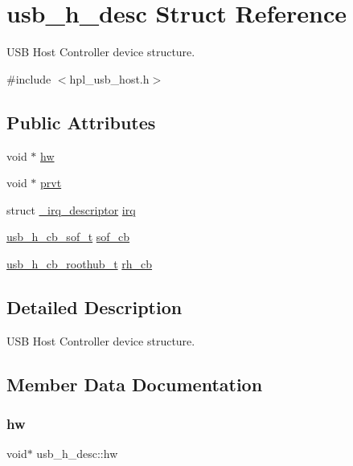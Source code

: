 \hypertarget{structusb__h__desc}{}\section{usb\+\_\+h\+\_\+desc Struct Reference}
\label{structusb__h__desc}


U\+SB Host Controller device structure.  




{\ttfamily \#include $<$hpl\+\_\+usb\+\_\+host.\+h$>$}

\subsection*{Public Attributes}
\begin{DoxyCompactItemize}
\item 
void $\ast$ \hyperlink{structusb__h__desc_a6058c618d39f7836b7025d2352ef08f8}{hw}
\item 
void $\ast$ \hyperlink{structusb__h__desc_a49877672c7dfa8cc9cede4e9b7a0e362}{prvt}
\item 
struct \hyperlink{struct__irq__descriptor}{\+\_\+irq\+\_\+descriptor} \hyperlink{structusb__h__desc_af51d57cf25ab32e379c108388d0e5c70}{irq}
\item 
\hyperlink{hpl__usb__host_8h_aa4342c321cc874eedaefdde86e06e6c3}{usb\+\_\+h\+\_\+cb\+\_\+sof\+\_\+t} \hyperlink{structusb__h__desc_af861986e911d7479de24d5ff65cbc752}{sof\+\_\+cb}
\item 
\hyperlink{hpl__usb__host_8h_aee4ec1554da1298d8875cd8e789c058a}{usb\+\_\+h\+\_\+cb\+\_\+roothub\+\_\+t} \hyperlink{structusb__h__desc_adeab338fa2a4dac953b4305b0b2defad}{rh\+\_\+cb}
\end{DoxyCompactItemize}


\subsection{Detailed Description}
U\+SB Host Controller device structure. 

\subsection{Member Data Documentation}
\mbox{\label{structusb__h__desc_a6058c618d39f7836b7025d2352ef08f8}} 
\subsubsection{\texorpdfstring{hw}{hw}}
{\footnotesize\ttfamily void$\ast$ usb\+\_\+h\+\_\+desc\+::hw}

